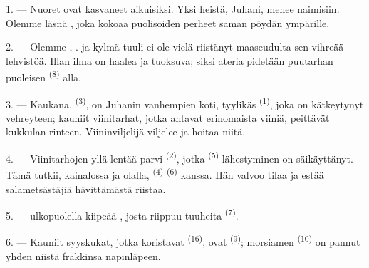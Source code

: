 
\VUsaut{4.0mm}
\VUsaut{1.6mm}
\VUsaut{3.2mm}

\VUsaut{1.6mm}
\VUsaut{2.6mm}

\VUsaut{3.0mm}

1. --- Nuoret ovat kasvaneet aikuisiksi. Yksi heistä, Juhani, menee naimisiin.
Olemme läsnä , joka kokoaa puolisoiden perheet saman pöydän
ympärille.

2. --- Olemme , .  ja
 kylmä tuuli ei ole vielä riistänyt maaseudulta sen vihreää
lehvistöä. Illan ilma on haalea ja tuoksuva; siksi ateria pidetään puutarhan
puoleisen  \textsuperscript{(8)} alla.

3. --- Kaukana,  \textsuperscript{(3)}, on Juhanin vanhempien
koti, tyylikäs  \textsuperscript{(1)}, joka on kätkeytynyt
vehreyteen; kauniit viinitarhat, jotka antavat erinomaista viiniä, peittävät
kukkulan rinteen. Viininviljelijä viljelee ja hoitaa niitä.

4. --- Viinitarhojen yllä lentää parvi  \textsuperscript{(2)},
jotka  \textsuperscript{(5)} lähestyminen on
säikäyttänyt. Tämä tutkii,  kainalossa ja
 olalla,  \textsuperscript{(4)}
 \textsuperscript{(6)} kanssa. Hän valvoo tilaa ja estää
salametsästäjiä hävittämästä riistaa.

5. ---  ulkopuolella kiipeää ,
josta riippuu tuuheita  \textsuperscript{(7)}.

6. --- Kauniit syyskukat, jotka koristavat 
\textsuperscript{(16)}, ovat  \textsuperscript{(9)};
morsiamen  \textsuperscript{(10)} on pannut yhden niistä frakkinsa
napinläpeen.

